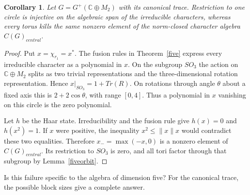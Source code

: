 \documentclass[11pt,a4paper]{article}
\newtheorem{cor}[thm]{Corollary}
\theoremstyle{remark}
\begin{document}
\begin{cor}\label{fivecharacters}
Let $G=G^+(\mathbb C\oplus M_2)$ with its canonical
trace. Restriction to one circle is injective on the algebraic span of
the irreducible characters, whereas every torus kills the same nonzero
element of the norm-closed character algebra $C(G)_{central}$.
\end{cor}
\begin{proof}
Put $x=\chi_{r_1}=x^*$. The fusion rules in Theorem~\ref{five} express
every irreducible character as a polynomial in $x$. On the subgroup
$SO_3$ the action on $\mathbb C\oplus M_2$ splits as two trivial
representations and the three-dimensional rotation representation.
Hence $x|_{SO_3}=1+Tr(R)$. On rotations through angle $\theta$
about a fixed axis this is $2+2\cos\theta$, with range $[0,4]$.
Thus a polynomial in $x$ vanishing on this circle is the zero polynomial.

Let $h$ be the Haar state. Irreducibility and the fusion rule give
$h(x)=0$ and $h(x^2)=1$. If $x$ were positive, the inequality
$x^2\le\|x\|x$ would contradict these two equalities. Therefore
$x_-=\max(-x,0)$ is a nonzero element of $C(G)_{central}$. Its restriction to
$SO_3$ is zero, and all tori factor through that subgroup by
Lemma~\ref{fiveorbit}.
\end{proof}

Is this failure specific to the algebra of dimension five? For the
canonical trace, the possible block sizes give a complete answer.
\end{document}
